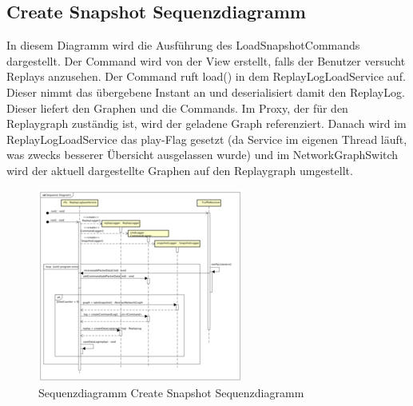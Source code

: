 \subsection{Create Snapshot Sequenzdiagramm}

In diesem Diagramm wird die Ausführung des LoadSnapshotCommands dargestellt. Der Command wird von der View erstellt, falls der Benutzer versucht Replays anzusehen. Der Command ruft load() in dem ReplayLogLoadService auf. Dieser nimmt das übergebene Instant an und deserialisiert damit den ReplayLog. Dieser liefert den Graphen und die Commands. Im Proxy, der für den Replaygraph zuständig ist, wird der geladene Graph referenziert. Danach wird im ReplayLogLoadService das play-Flag gesetzt (da Service im eigenen Thread läuft, was zwecks besserer Übersicht ausgelassen wurde) und im NetworkGraphSwitch wird der aktuell dargestellte Graphen auf den Replaygraph umgestellt.

\begin{figure}[H]
  \centering
  \includegraphics[width=\textwidth]{../diagramimages/sd_createsnapshot.png}
  \caption[Sequenzdiagramm Create Snapshot Sequenzdiagramm]{Sequenzdiagramm Create Snapshot Sequenzdiagramm}
\end{figure}